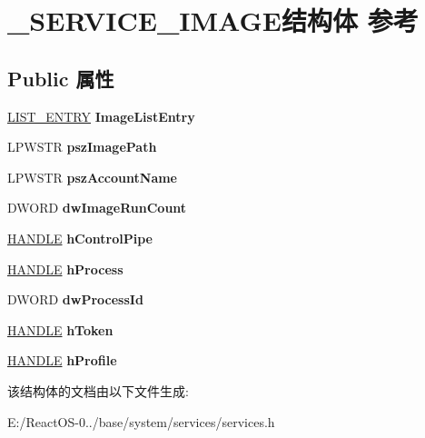 \hypertarget{struct___s_e_r_v_i_c_e___i_m_a_g_e}{}\section{\+\_\+\+S\+E\+R\+V\+I\+C\+E\+\_\+\+I\+M\+A\+G\+E结构体 参考}
\label{struct___s_e_r_v_i_c_e___i_m_a_g_e}
\subsection*{Public 属性}
\begin{DoxyCompactItemize}
\item 
\mbox{\label{struct___s_e_r_v_i_c_e___i_m_a_g_e_a478c9d58a9dc47818b8a75896a94b944}} 
\hyperlink{struct___l_i_s_t___e_n_t_r_y}{L\+I\+S\+T\+\_\+\+E\+N\+T\+RY} {\bfseries Image\+List\+Entry}
\item 
\mbox{\label{struct___s_e_r_v_i_c_e___i_m_a_g_e_a1328faf29b3c72999e3cdd030fe9e857}} 
L\+P\+W\+S\+TR {\bfseries psz\+Image\+Path}
\item 
\mbox{\label{struct___s_e_r_v_i_c_e___i_m_a_g_e_a9b45072059a61a35f4c9aa9c4ea6ac3a}} 
L\+P\+W\+S\+TR {\bfseries psz\+Account\+Name}
\item 
\mbox{\label{struct___s_e_r_v_i_c_e___i_m_a_g_e_ab60a3bac7b53c673f7a400d96af5ce3f}} 
D\+W\+O\+RD {\bfseries dw\+Image\+Run\+Count}
\item 
\mbox{\label{struct___s_e_r_v_i_c_e___i_m_a_g_e_a0c62ea2f07b47d32771a282e90a3c137}} 
\hyperlink{interfacevoid}{H\+A\+N\+D\+LE} {\bfseries h\+Control\+Pipe}
\item 
\mbox{\label{struct___s_e_r_v_i_c_e___i_m_a_g_e_ae1787ec46be80d92f3a8228126ee557f}} 
\hyperlink{interfacevoid}{H\+A\+N\+D\+LE} {\bfseries h\+Process}
\item 
\mbox{\label{struct___s_e_r_v_i_c_e___i_m_a_g_e_a9e85162b7f4fcbef7df2dfedead2f7c0}} 
D\+W\+O\+RD {\bfseries dw\+Process\+Id}
\item 
\mbox{\label{struct___s_e_r_v_i_c_e___i_m_a_g_e_a9c1c1d87f6dcc602d02880d727e22e34}} 
\hyperlink{interfacevoid}{H\+A\+N\+D\+LE} {\bfseries h\+Token}
\item 
\mbox{\label{struct___s_e_r_v_i_c_e___i_m_a_g_e_a631130cb39ded6a6fda394b4ad57bb42}} 
\hyperlink{interfacevoid}{H\+A\+N\+D\+LE} {\bfseries h\+Profile}
\end{DoxyCompactItemize}


该结构体的文档由以下文件生成\+:\begin{DoxyCompactItemize}
\item 
E\+:/\+React\+O\+S-\/0../base/system/services/services.\+h\end{DoxyCompactItemize}
